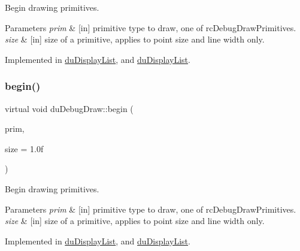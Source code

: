 Begin drawing primitives. 
\begin{DoxyParams}{Parameters}
{\em prim} & \mbox{[}in\mbox{]} primitive type to draw, one of rc\+Debug\+Draw\+Primitives. \\
\hline
{\em size} & \mbox{[}in\mbox{]} size of a primitive, applies to point size and line width only. \\
\hline
\end{DoxyParams}


Implemented in \hyperlink{classduDisplayList_a9b22850cbe77c3e59f00ceda818563ea}{du\+Display\+List}, and \hyperlink{classduDisplayList_af71c472060ddabb596471dce5eb3e95f}{du\+Display\+List}.

\mbox{\label{structduDebugDraw_a6403932173f27503e05cd258f5837d17}} 
\subsubsection{\texorpdfstring{begin()}{begin()}\hspace{0.1cm}{\footnotesize\ttfamily [2/2]}}
{\footnotesize\ttfamily virtual void du\+Debug\+Draw\+::begin (\begin{DoxyParamCaption}\item[{du\+Debug\+Draw\+Primitives}]{prim,  }\item[{float}]{size = {\ttfamily 1.0f} }\end{DoxyParamCaption})\hspace{0.3cm}{\ttfamily [pure virtual]}}

Begin drawing primitives. 
\begin{DoxyParams}{Parameters}
{\em prim} & \mbox{[}in\mbox{]} primitive type to draw, one of rc\+Debug\+Draw\+Primitives. \\
\hline
{\em size} & \mbox{[}in\mbox{]} size of a primitive, applies to point size and line width only. \\
\hline
\end{DoxyParams}


Implemented in \hyperlink{classduDisplayList_a9b22850cbe77c3e59f00ceda818563ea}{du\+Display\+List}, and \hyperlink{classduDisplayList_af71c472060ddabb596471dce5eb3e95f}{du\+Display\+List}.

\mbox{\label{structduDebugDraw_a8fac1072846b60be4ce4810c68140ee8}} 
